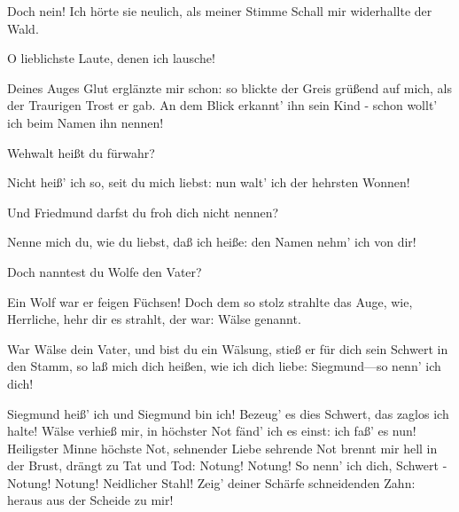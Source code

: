 \begin{drama}

Doch nein! Ich hörte sie neulich,
als meiner Stimme Schall
mir widerhallte der Wald.
 

\Siegmundspeaks
O lieblichste Laute,
denen ich lausche!
 

\Sieglindespeaks


Deines Auges Glut erglänzte mir schon:
so blickte der Greis grüßend auf mich,
als der Traurigen Trost er gab.
An dem Blick erkannt' ihn sein Kind -
schon wollt' ich beim Namen ihn nennen!
 



Wehwalt heißt du fürwahr?
 

\Siegmundspeaks
Nicht heiß' ich so, seit du mich liebst:
nun walt' ich der hehrsten Wonnen!
 

\Sieglindespeaks
Und Friedmund darfst du
froh dich nicht nennen?
 

\Siegmundspeaks
Nenne mich du, wie du liebst, daß ich heiße:
den Namen nehm' ich von dir!
 

\Sieglindespeaks
Doch nanntest du Wolfe den Vater?
 

\Siegmundspeaks
Ein Wolf war er feigen Füchsen!
Doch dem so stolz strahlte das Auge,
wie, Herrliche, hehr dir es strahlt,
der war: Wälse genannt.
 

\Sieglindespeaks


War Wälse dein Vater, und bist du ein Wälsung,
stieß er für dich sein Schwert in den Stamm,
so laß mich dich heißen, wie ich dich liebe:
Siegmund---so nenn' ich dich!
 

\Siegmundspeaks


Siegmund heiß' ich und Siegmund bin ich!
Bezeug' es dies Schwert, das zaglos ich halte!
Wälse verhieß mir, in höchster Not
fänd' ich es einst: ich faß' es nun!
Heiligster Minne höchste Not,
sehnender Liebe sehrende Not
brennt mir hell in der Brust,
drängt zu Tat und Tod:
Notung! Notung! So nenn' ich dich, Schwert -
Notung! Notung! Neidlicher Stahl!
Zeig' deiner Schärfe schneidenden Zahn:
heraus aus der Scheide zu mir!
 





\end{drama}
